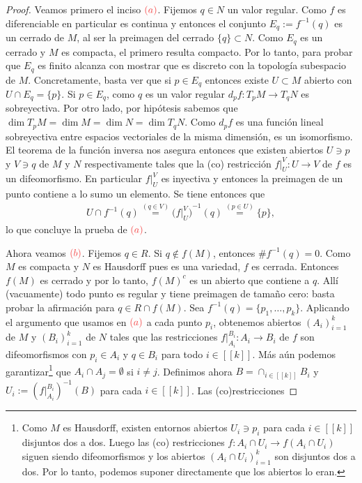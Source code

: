\documentclass[11pt]{article}
\newcommand{\nat}[1]{[\![#1]\!]}
\newcommand{\paint}[2]{\color{#1}{#2}}
\begin{document}
\begin{proof} Veamos primero el inciso $\paint{red}{(a)}$. Fijemos $q \in N$ un valor regular. Como $f$ es diferenciable en particular es continua y entonces el conjunto $E_q := f^{-1}(q)$ es un cerrado de $M$, al ser la preimagen del cerrado $\{q\} \subset N$. Como $E_q$ es un cerrado y $M$ es compacta, el primero resulta compacto. Por lo tanto, para probar que $E_q$ es finito alcanza con mostrar que es discreto con la topolog\'ia subespacio de $M$. Concretamente, basta ver que si $p \in E_q$ entonces existe $U \subset M$ abierto con $U \cap E_q = \{p\}$. Si $p \in E_q$, como $q$ es un valor regular $d_pf :T_pM \to T_qN$ es sobreyectiva. Por otro lado, por hip\'otesis sabemos que $\dim T_pM = \dim M = \dim N = \dim T_qN$. Como $d_pf$ es una funci\'on lineal sobreyectiva entre espacios vectoriales de la misma dimensi\'on, es un isomorfismo. El teorema de la funci\'on inversa nos asegura entonces que existen abiertos $U \ni p$ y $V \ni q$ de $M$ y $N$ respectivamente tales que la (co) restricci\'on $f|_U^V : U \to V$ de $f$ es un difeomorfismo. En particular $f|_U^V$ es inyectiva y entonces la preimagen de un punto contiene a lo sumo un elemento. Se tiene entonces que
\begin{align*}
U \cap f^{-1}(q) \stackrel{(q \in V)}{=} ({f|^V_U)}^{-1}(q) \stackrel{(p \in U)}{=} \{p\},
\end{align*}
lo que concluye la prueba de $\paint{red}{(a)}$. 

Ahora veamos $\paint{red}{(b)}$. Fijemos $q \in R$. Si $q \not \in f(M)$, entonces $\#f^{-1}(q) = 0$. Como $M$ es compacta y $N$ es Hausdorff pues es una variedad, $f$ es cerrada. Entonces $f(M)$ es cerrado y por lo tanto, $f(M)^c$ es un abierto que contiene a $q$. All\'i (vacuamente) todo punto es regular y tiene preimagen de tamaño cero: basta probar la afirmaci\'on para $q \in R \cap f(M)$. Sea $f^{-1}(q) = \{p_1, \dots, p_k\}$. Aplicando el argumento que usamos en $\paint{red}{(a)}$ a cada punto $p_i$, obtenemos abiertos $(A_i)_{i=1}^k$ de $M$ y $(B_i)_{i=1}^k$ de $N$ tales que las restricciones $f|_{A_i}^{B_i} : A_i \to B_i$ de $f$ son difeomorfismos con $p_i \in A_i$ y $q \in B_i$ para todo $i \in \nat{k}$. M\'as a\'un podemos garantizar\footnote{Como $M$ es Hausdorff, existen entornos abiertos $U_i \ni p_i$ para cada $i \in \nat{k}$ disjuntos dos a dos. Luego las (co) restricciones $f : A_i \cap U_i \to f(A_i \cap U_i)$ siguen siendo difeomorfismos y los abiertos $(A_i \cap U_i)_{i=1}^k$ son disjuntos dos a dos. Por lo tanto, podemos suponer directamente que los abiertos lo eran.} que $A_i \cap A_j = \emptyset$ si $i \neq j$. Definimos ahora $B = \cap_{i \in \nat{k}}B_i$ y $U_i := (f|_{A_i}^{B_i})^{-1}(B)$ para cada $i \in \nat{k}$. Las (co)restricciones


\end{proof}
\end{document}
